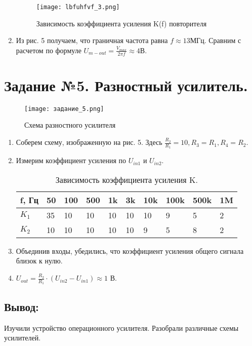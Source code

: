 \documentclass[12pt,a4paper]{article}
\begin{document}
\begin{enumerate}
\begin{figure}[H]
    \begin{center}
        \texttt{[image: lbfuhfvf\_3.png]}
        \caption{Зависимость коэффициента усиления K(f) повторителя}
        \label{Sallen-Ki}
    \end{center}
\end{figure}

\item Из рис. 5 получаем, что граничная частота равна $f \approx 13$МГц. Сравним с расчетом по формуле $U_{m-out} = \frac{V_{max}}{2 \pi f} \approx 4$В.

\end{enumerate}
\section{Задание №5. Разностный усилитель. }


\begin{figure}[H]
    \begin{center}
        \texttt{[image: задание\_5.png]}
        \caption{Схема разностного усилителя}
        \label{Sallen-Ki}
    \end{center}
\end{figure}

\begin{enumerate}
    \item Соберем схему, изображенную на рис. 5. Здесь $\frac{R_2}{R_1} = 10, R_3 = R_1, R_4 =R_2$.
    \item Измерим коэффициент усиления по $U_{in1} $ и $U_{in2}$. 
     
    \begin{table}[H]
        \centering
        \begin{center}
        \end{center}
        \vspace{0.1cm}
        \label{tab:my_label}
        \begin{tabular}{|p{2cm}|p{1cm}|p{1cm}|p{1cm}|p{1cm}|p{1cm}|p{1cm}|p{1cm}|p{1cm}|p{1cm}|}
            \hline
            f, Гц & 50 & 100  & 500 & 1k & 3k & 10k & 100k & 500k  & 1M  \\ 
            \hline
            $K_1$   & 35 &  10  &  10 & 10  & 10  & 10 &  9 &  5 & 2 \\
            \hline
            $K_2$  & 10 &   10 &   10  & 10  & 10  & 9 &  5 &  8 & 2 \\
            \hline
            \end{tabular}
            \caption{Зависимость коэффициента усиления K.}
    \end{table}

    \item  Объединив входы, убедились, что коэффициент усиления общего сигнала близок к нулю.
    \item $U_{out} = \frac{R_2}{R_1}\cdot(U_{in2} - U_{in1}) \approx 1$ В.

\end{enumerate}

\subsection{Вывод:}
Изучили устройство операционного усилителя. Разобрали различные схемы усилителей.
\end{document}
